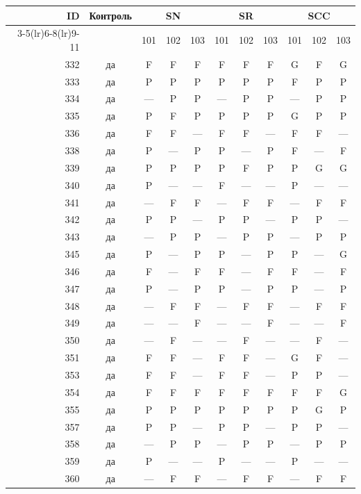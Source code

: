 \begin{table}[p]\centering\small
\begin{tabular*}{\textwidth}{@{\extracolsep{\fill}}rc*{9}{c}@{}}\toprule
ID & Контроль & \multicolumn{3}{c}{SN} & \multicolumn{3}{c}{SR} & \multicolumn{3}{c}{SCC}\\
\cmidrule(lr){3-5}\cmidrule(lr){6-8}\cmidrule(lr){9-11}
 & & 101 & 102 & 103 & 101 & 102 & 103 & 101 & 102 & 103\\\midrule
332 & да & F & F & F & F & F & F & G & F & G\\
333 & да & P & P & P & P & P & P & F & P & P\\
334 & да & — & P & P & — & P & P & — & P & P\\
335 & да & P & F & P & P & P & P & G & P & P\\
336 & да & F & F & — & F & F & — & F & F & —\\
338 & да & P & — & P & P & — & P & F & — & F\\
339 & да & P & P & P & P & F & P & P & G & G\\
340 & да & P & — & — & F & — & — & P & — & —\\
341 & да & — & F & F & — & F & F & — & F & F\\
342 & да & P & P & — & P & P & — & P & P & —\\
343 & да & — & P & P & — & P & P & — & P & P\\
345 & да & P & — & P & P & — & P & P & — & G\\
346 & да & F & — & F & F & — & F & F & — & F\\
347 & да & P & — & P & P & — & P & P & — & P\\
348 & да & — & F & F & — & F & F & — & F & F\\
349 & да & — & — & F & — & — & F & — & — & F\\
350 & да & — & F & — & — & F & — & — & F & —\\
351 & да & F & F & — & F & F & — & G & F & —\\
353 & да & F & F & — & F & F & — & P & P & —\\
354 & да & F & F & F & F & F & F & F & F & G\\
355 & да & P & P & P & P & P & P & P & G & P\\
357 & да & P & P & — & P & P & — & P & P & —\\
358 & да & — & P & P & — & P & P & — & P & P\\
359 & да & P & — & — & P & — & — & P & — & —\\
360 & да & — & F & F & — & F & F & — & F & F\\

\end{tabular*}
\end{table}
